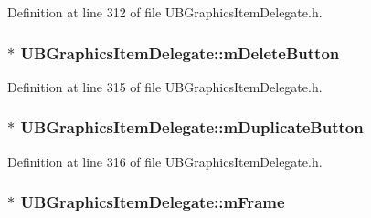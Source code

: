 Definition at line 312 of file U\-B\-Graphics\-Item\-Delegate.\-h.

\hypertarget{class_u_b_graphics_item_delegate_aed94a4b82e2b6b34a08036c872a5e277}{
\subsubsection[{m\-Delete\-Button}]{$\ast$ U\-B\-Graphics\-Item\-Delegate\-::m\-Delete\-Button\hspace{0.3cm}{\ttfamily [protected]}}}\label{dd/dd5/class_u_b_graphics_item_delegate_aed94a4b82e2b6b34a08036c872a5e277}


Definition at line 315 of file U\-B\-Graphics\-Item\-Delegate.\-h.

\hypertarget{class_u_b_graphics_item_delegate_a554f13c224fba040eea5ae81d9e429df}{
\subsubsection[{m\-Duplicate\-Button}]{$\ast$ U\-B\-Graphics\-Item\-Delegate\-::m\-Duplicate\-Button\hspace{0.3cm}{\ttfamily [protected]}}}\label{dd/dd5/class_u_b_graphics_item_delegate_a554f13c224fba040eea5ae81d9e429df}


Definition at line 316 of file U\-B\-Graphics\-Item\-Delegate.\-h.

\hypertarget{class_u_b_graphics_item_delegate_aefc58035670f33d0309f1f572452e8b2}{
\subsubsection[{m\-Frame}]{$\ast$ U\-B\-Graphics\-Item\-Delegate\-::m\-Frame\hspace{0.3cm}{\ttfamily [protected]}}}\label{dd/dd5/class_u_b_graphics_item_delegate_aefc58035670f33d0309f1f572452e8b2}


